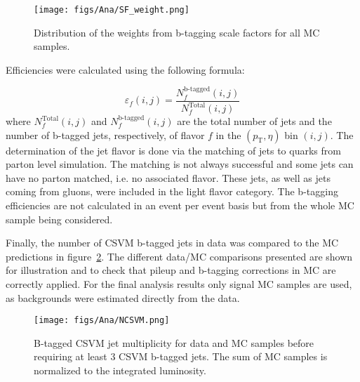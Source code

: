 
\begin{figure}[!Hhtbp]
  \begin{center}
    \texttt{[image: figs/Ana/SF\_weight.png]}
    \caption{Distribution of the weights from b-tagging scale factors for all MC samples.}
    \label{fig:SFweight}
  \end{center}
\end{figure}

Efficiencies were calculated using the following formula:

\begin{equation}
  \label{eq:btaggingeff}
  \varepsilon_f(i,j) = \frac{N_f^\text{b-tagged}(i,j)}{N_f^\text{Total}(i,j)}
\end{equation} where $ N_f^\text{Total}(i,j) $ and $ N_f^\text{b-tagged}(i,j) $ are the total number of jets and the number of b-tagged jets, respectively, of flavor $ f $ in the $ (p_\text{T},\eta) $ bin $ (i,j) $. The determination of the jet flavor is done via the matching of jets to quarks from parton level simulation. The matching is not always successful and some jets can have no parton matched, i.e. no associated flavor. These jets, as well as jets coming from gluons, were included in the light flavor category. The b-tagging efficiencies are not calculated in an event per event basis but from the whole MC sample being considered.

Finally, the number of CSVM b-tagged jets in data was compared to the MC predictions in figure~\ref{fig:Nb}. The different data/MC comparisons presented are shown for illustration and to check that pileup and b-tagging corrections in MC are correctly applied. For the final analysis results only signal MC samples are used, as backgrounds were estimated directly from the data.

\begin{figure}[!Hhtbp]
  \begin{center}
    \texttt{[image: figs/Ana/NCSVM.png]}
    \caption{B-tagged CSVM jet multiplicity for data and MC samples before requiring at least 3 CSVM b-tagged jets. The sum of MC samples is normalized to the integrated luminosity.}
    \label{fig:Nb}
  \end{center}
\end{figure}

